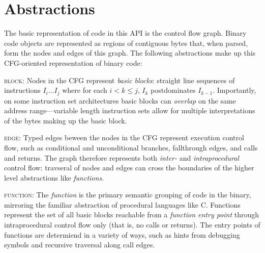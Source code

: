 \documentclass{article}
\begin{document}
\section{Abstractions}
\label{sec:abstractions}

The basic representation of code in this API is the control flow
graph. Binary code objects are represented as regions of contiguous bytes that, when parsed, form the nodes and edges of this graph. The following abstractions make up this CFG-oriented representation of binary code:

%
\begin{itemize}[leftmargin=0pt,label=$\circ$]


{\item {\scshape block}: Nodes in the CFG represent \emph{basic blocks}:
straight line sequences of instructions $I_i \ldots I_j$ where for each $i < k
\le j$, $I_k$ postdominates $I_{k-1}$. Importantly, on some instruction set architectures basic blocks can \emph{overlap} on the same address range---variable length instruction sets allow for multiple interpretations of the bytes making up the basic block.
}

{\item {\scshape edge}: Typed edges beween the nodes in the CFG represent
execution control flow, such as conditional and unconditional branches,
fallthrough edges, and calls and returns. The graph therefore represents both
\emph{inter-} and \emph{intraprocedural} control flow: travseral of nodes and
edges can cross the boundaries of the higher level abstractions like
\emph{functions}.
}

{\item {\scshape function}: The \emph{function} is the primary semantic grouping of code in the binary, mirroring the familiar abstraction of procedural languages like C. Functions represent the set of all basic blocks reachable from a \emph{function entry point} through intraprocedural control flow only (that is, no calls or returns). The entry points of functions are determiend in a variety of ways, such as hints from debugging symbols and recursive traversal along call edges.
}

\end{itemize}
\end{document}
